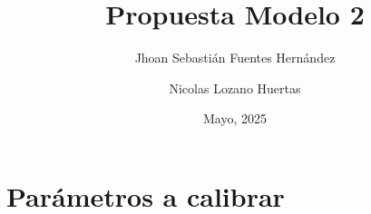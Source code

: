 \documentclass{article}
\title{\textbf{Propuesta Modelo 2}}
\author{Jhoan Sebasti\'an Fuentes Hern\'andez \and Nicolas Lozano Huertas}
\date{Mayo, 2025}
\theoremstyle{remark}
\theoremstyle{definition}
\begin{document}
\maketitle

\section{Par\'ametros a calibrar}
\end{document}

